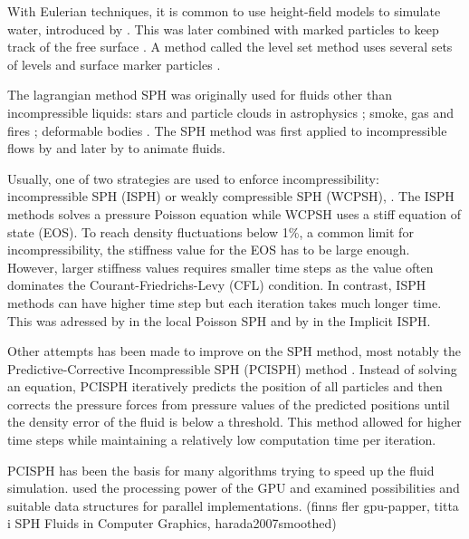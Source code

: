 \documentclass[../../main.tex]{subfiles}
\begin{document}
\tracingall

With Eulerian techniques, it is common to use height-field models to simulate water, introduced by \citet{kass1990rapid}. This was later combined with marked particles to keep track of the free surface \citep{foster1996realistic}. A method called the level set method uses several sets of levels and surface marker particles \citep{enright2002hybrid}. 

The lagrangian method SPH was originally used for fluids other than incompressible liquids: stars and particle clouds in astrophysics \citep{lucy1977numerical, gingold1977smoothed}; smoke, gas and fires \citep{stam1995depicting}; deformable bodies \citep{desbrun1996smoothed}. The SPH method was first applied to incompressible flows by \citet{monaghan1994simulating} and later by \citet{muller2003particle} to animate fluids. 

Usually, one of two strategies are used to enforce incompressibility: incompressible SPH (ISPH) or weakly compressible SPH (WCPSH), \citep{becker2007weakly}. The ISPH methods solves a pressure Poisson equation while WCPSH uses a stiff equation of state (EOS). To reach density fluctuations below 1\%, a common limit for incompressibility, the stiffness value for the EOS has to be large enough. However, larger stiffness values requires smaller time steps as the value often dominates the Courant-Friedrichs-Levy (CFL) condition. In contrast, ISPH methods can have higher time step but each iteration takes much longer time. This was adressed by \citet{he2012local} in the local Poisson SPH and by \citet{ihmsen2014implicit} in the Implicit ISPH. 

Other attempts has been made to improve on the SPH method, most notably the Predictive-Corrective Incompressible SPH (PCISPH) method \citep{solenthaler2009predictive}. Instead of solving an equation, PCISPH iteratively predicts the position of all particles and then corrects the pressure forces from pressure values of the predicted positions until the density error of the fluid is below a threshold. This method allowed for higher time steps while maintaining a relatively low computation time per iteration. 

PCISPH has been the basis for many algorithms trying to speed up the fluid simulation. \citet{goswami2010interactive} used the processing power of the GPU and \citet{ihmsen2011parallel} examined possibilities and suitable data structures for parallel implementations. (finns fler gpu-papper, titta i SPH Fluids in Computer Graphics, harada2007smoothed)
\end{document}
